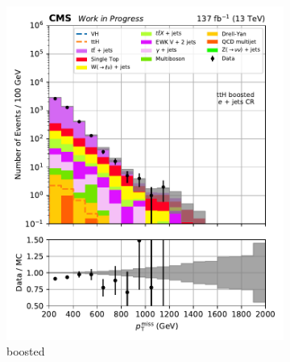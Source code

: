 \begin{figure}[htbp]
    \centering
    \begin{subfigure}[b]{0.24\textwidth}
        \includegraphics[width=\textwidth]{figures/region_plots/2016to18/region_3/ttH_boosted.pdf}
        \caption{\ttH boosted}
    \end{subfigure}
    \hfill
    \begin{subfigure}[b]{0.24\textwidth}

\end{subfigure}
\end{figure}
